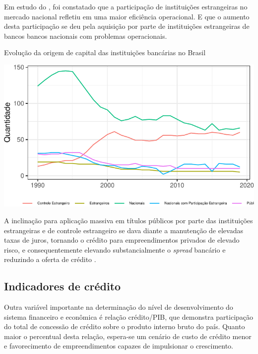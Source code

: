 \documentclass[
  12pt,
  12pt,
  openright,
  oneside,
  a4paper,
  chapter=TITLE,
  section=TITLE,
  subsection=TITLE,
  subsubsection=TITLE,
  english,
  portugues,
  sumario=tradicional]{abntex2}
\begin{document}
Em estudo do \textcite{BCB:1999}, foi constatado que a participação de instituições estrangeiras no mercado nacional refletiu em uma maior eficiência operacional. E que o aumento desta participação se deu pela aquisição por parte de instituições estrangeiras de bancos bancos nacionais com problemas operacionais.

\begin{grafico}[!htbp]
\vspace{20pt}
\caption{Evolução da origem de capital das instituições bancárias no Brasil}
\vspace{-4mm}

\begin{center}\includegraphics{12-exportedfigures/capital.graphic-1} \end{center}
\label{graf:ev.capital}
\end{grafico}

A inclinação para aplicação massiva em títulos públicos por parte das instituições estrangeiras e de controle estrangeiro se dava diante a manutenção de elevadas taxas de juros, tornando o crédito para empreendimentos privados de elevado risco, e consequentemente elevando substancialmente o \emph{spread} bancário e reduzindo a oferta de crédito \cite{camargo:2009}.

\subsection{Indicadores de crédito}

Outra variável importante na determinação do nível de desenvolvimento do sistema financeiro e econômica é relação crédito/PIB, que demonstra participação do total de concessão de crédito sobre o produto interno bruto do país. Quanto maior o percentual desta relação, espera-se um cenário de custo de crédito menor e favorecimento de empreendimentos capazes de impulsionar o crescimento.
\end{document}
